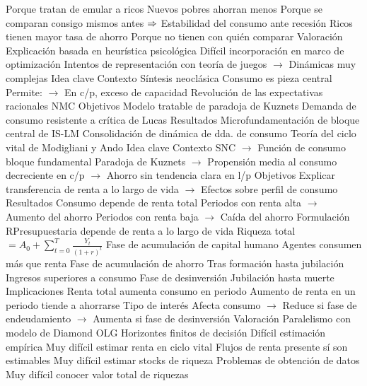 \documentclass{nuevotema}
\begin{document}
\begin{esquemal}
				\4[] Porque tratan de emular a ricos
				\4 Nuevos pobres ahorran menos
				\4[] Porque se comparan consigo mismos antes
				\4[] $\Rightarrow$ Estabilidad del consumo ante recesión
				\4 Ricos tienen mayor tasa de ahorro
				\4[] Porque no tienen con quién comparar
			\3 Valoración
				\4 Explicación basada en heurística psicológica
				\4 Difícil incorporación en marco de optimización
				\4[] Intentos de representación con teoría de juegos
				\4[] $\to$ Dinámicas muy complejas
	\1 
		\2 Idea clave
			\3 Contexto
				\4 Síntesis neoclásica
				\4[] Consumo es pieza central
				\4[] Permite:
				\4[] $\to$ En c/p, exceso de capacidad
				\4 Revolución de las expectativas racionales
				\4 NMC
			\3 Objetivos
				\4 Modelo tratable de paradoja de Kuznets
				\4 Demanda de consumo resistente a crítica de Lucas
			\3 Resultados
				\4 Microfundamentación de bloque central de IS-LM
				\4 Consolidación de dinámica de dda. de consumo
		\2 Teoría del ciclo vital de Modigliani y Ando
			\3 Idea clave
				\4 Contexto
				\4[] SNC
				\4[] $\to$ Función de consumo bloque fundamental
				\4[] Paradoja de Kuznets
				\4[] $\to$ Propensión media al consumo decreciente en c/p
				\4[] $\to$ Ahorro sin tendencia clara en l/p
				\4 Objetivos
				\4[] Explicar transferencia de renta a lo largo de vida
				\4[] $\to$ Efectos sobre perfil de consumo
				\4 Resultados
				\4[] Consumo depende de renta total
				\4[] Periodos con renta alta
				\4[] $\to$ Aumento del ahorro
				\4[] Periodos con renta baja
				\4[] $\to$ Caída del ahorro
			\3 Formulación
				\4 RPresupuestaria depende de renta a lo largo de vida
				\4[] Riqueza total $= A_0 + \sum_{t=0}^T \frac{Y_t}{(1+r)^t}$
				\4 Fase de acumulación de capital humano
				\4[] Agentes consumen más que renta
				\4 Fase de acumulación de ahorro
				\4[] Tras formación hasta jubilación
				\4[] Ingresos superiores a consumo
				\4 Fase de desinversión
				\4[] Jubilación hasta muerte
			\3 Implicaciones
				\4 Renta total aumenta consumo en periodo
				\4 Aumento de renta en un periodo tiende a ahorrarse
				\4 Tipo de interés
				\4[] Afecta consumo
				\4[] $\to$ Reduce si fase de endeudamiento
				\4[] $\to$ Aumenta si fase de desinversión
			\3 Valoración
				\4 Paralelismo con modelo de Diamond OLG
				\4[] Horizontes finitos de decisión
				\4 Difícil estimación empírica
				\4[] Muy difícil estimar renta en ciclo vital
				\4[] Flujos de renta presente sí son estimables
				\4[] Muy difícil estimar stocks de riqueza
				\4 Problemas de obtención de datos
				\4[] Muy difícil conocer valor total de riquezas

\end{esquemal}
\end{document}
